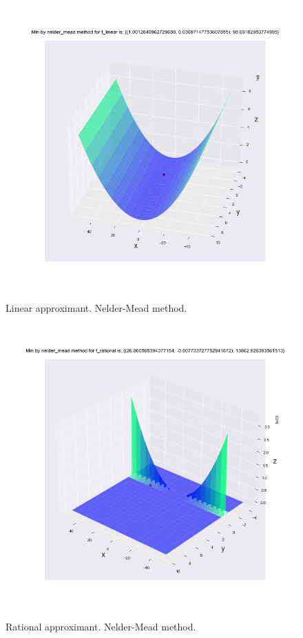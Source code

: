 \documentclass[a4paper,article,14pt]{extarticle}
\begin{document}
	\begin{figure}[h]
		\centering
		\includegraphics[scale=0.5]{f_linear_nelder_mead.png}
		\caption{Linear approximant. Nelder-Mead method.}
		\label{linearNM}
	\end{figure} 
	\begin{figure}[h]
		\centering
		\includegraphics[scale=0.5]{f_rational_nelder_mead.png}
		\caption{Rational approximant. Nelder-Mead method.}
		\label{rationalNM}
	\end{figure} 
	
\end{document}
